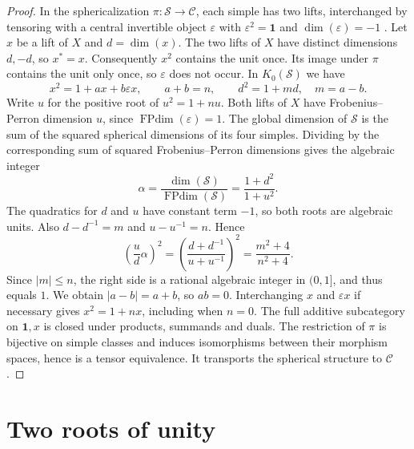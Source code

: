 \documentclass[11pt,a4paper]{article}
\newcommand{\one}{\mathbf 1}
\newcommand{\cC}{\mathcal C}
\newcommand{\cS}{\mathcal S}
\DeclareMathOperator{\FPdim}{FPdim}
\numberwithin{equation}{section}
\begin{document}
\begin{proof}
In the sphericalization $\pi:\cS\to\cC$, each simple has two lifts,
interchanged by tensoring with a central invertible object
$\varepsilon$ with $\varepsilon^2=\one$ and $\dim(\varepsilon)=-1$
\cite[Remark~3.1 and Proposition~5.14]{ENO}. Let $x$ be a lift of
$X$ and $d=\dim(x)$. The two lifts of $X$ have distinct dimensions
$d,-d$, so $x^*=x$. Consequently $x^2$ contains the unit once. Its
image under $\pi$ contains the unit only once, so $\varepsilon$ does
not occur. In $K_0(\cS)$ we have
\[
 x^2=1+a x+b\varepsilon x,\qquad a+b=n,\qquad
 d^2=1+md,\quad m=a-b .
\]
Write $u$ for the positive root of $u^2=1+nu$. Both lifts of $X$
have Frobenius--Perron dimension $u$, since $\FPdim(\varepsilon)=1$.
The global dimension of $\cS$ is the sum of the squared spherical
dimensions of its four simples. Dividing by the corresponding sum of
squared Frobenius--Perron dimensions gives the algebraic integer
\cite[Proposition~8.22]{ENO}
\[
  \alpha=\frac{\dim(\cS)}{\FPdim(\cS)}
         =\frac{1+d^2}{1+u^2}.
\]
The quadratics for $d$ and $u$ have constant term $-1$, so both roots
are algebraic units. Also $d-d^{-1}=m$ and $u-u^{-1}=n$. Hence
\begin{equation}\label{eq:divisibility}
 \left(\frac{u}{d}\alpha\right)^2
   =\left(\frac{d+d^{-1}}{u+u^{-1}}\right)^2
   =\frac{m^2+4}{n^2+4}.
\end{equation}
Since $|m|\leq n$, the right side is a rational algebraic integer in $(0,1]$, and thus
equals $1$. We obtain $|a-b|=a+b$, so $ab=0$. Interchanging $x$
and $\varepsilon x$ if necessary gives $x^2=1+nx$, including when
$n=0$. The full additive subcategory on $\one,x$ is closed under
products, summands and duals. The restriction of $\pi$ is bijective
on simple classes and induces isomorphisms between their morphism
spaces, hence is a tensor equivalence. It transports the spherical
structure to $\cC$.
\end{proof}

\section{Two roots of unity}\label{sec:center}
\end{document}
